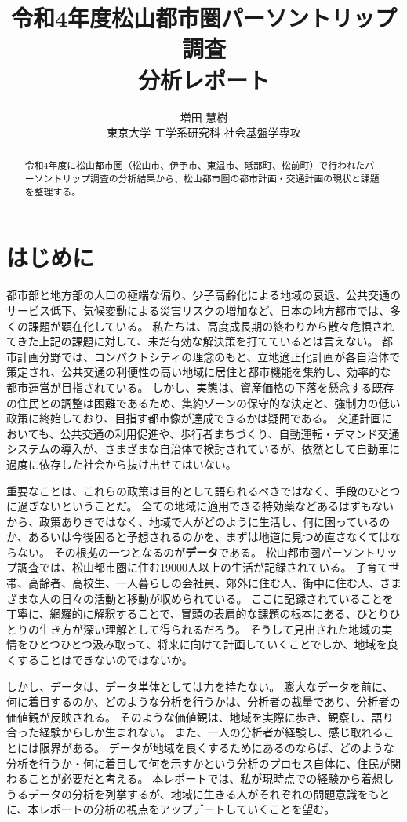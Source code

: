 \documentclass[a4paper,12pt]{jsbook}
\title{令和4年度松山都市圏パーソントリップ調査\\分析レポート
\vspace{10cm}}
\author{ \Large 増田 慧樹 \\
東京大学 工学系研究科 社会基盤学専攻
}
\date{}
\begin{document}
\maketitle

\begin{abstract}
令和4年度に松山都市圏（松山市、伊予市、東温市、砥部町、松前町）で行われたパーソントリップ調査の分析結果から、松山都市圏の都市計画・交通計画の現状と課題を整理する。
\end{abstract}

\tableofcontents

\chapter{はじめに}
都市部と地方部の人口の極端な偏り、少子高齢化による地域の衰退、公共交通のサービス低下、気候変動による災害リスクの増加など、日本の地方都市では、多くの課題が顕在化している。
私たちは、高度成長期の終わりから散々危惧されてきた上記の課題に対して、未だ有効な解決策を打てているとは言えない。
都市計画分野では、コンパクトシティの理念のもと、立地適正化計画が各自治体で策定され、公共交通の利便性の高い地域に居住と都市機能を集約し、効率的な都市運営が目指されている。
しかし、実態は、資産価格の下落を懸念する既存の住民との調整は困難であるため、集約ゾーンの保守的な決定と、強制力の低い政策に終始しており、目指す都市像が達成できるかは疑問である。
交通計画においても、公共交通の利用促進や、歩行者まちづくり、自動運転・デマンド交通システムの導入が、さまざまな自治体で検討されているが、依然として自動車に過度に依存した社会から抜け出せてはいない。

重要なことは、これらの政策は目的として語られるべきではなく、手段のひとつに過ぎないということだ。
全ての地域に適用できる特効薬などあるはずもないから、政策ありきではなく、地域で人がどのように生活し、何に困っているのか、あるいは今後困ると予想されるのかを、まずは地道に見つめ直さなくてはならない。
その根拠の一つとなるのが\textbf{データ}である。
松山都市圏パーソントリップ調査では、松山都市圏に住む19000人以上の生活が記録されている。
子育て世帯、高齢者、高校生、一人暮らしの会社員、郊外に住む人、街中に住む人、さまざまな人の日々の活動と移動が収められている。
ここに記録されていることを丁寧に、網羅的に解釈することで、冒頭の表層的な課題の根本にある、ひとりひとりの生き方が深い理解として得られるだろう。
そうして見出された地域の実情をひとつひとつ汲み取って、将来に向けて計画していくことでしか、地域を良くすることはできないのではないか。

しかし、データは、データ単体としては力を持たない。
膨大なデータを前に、何に着目するのか、どのような分析を行うかは、分析者の裁量であり、分析者の価値観が反映される。
そのような価値観は、地域を実際に歩き、観察し、語り合った経験からしか生まれない。
また、一人の分析者が経験し、感じ取れることには限界がある。
データが地域を良くするためにあるのならば、どのような分析を行うか・何に着目して何を示すかという分析のプロセス自体に、住民が関わることが必要だと考える。
本レポートでは、私が現時点での経験から着想しうるデータの分析を列挙するが、地域に生きる人がそれぞれの問題意識をもとに、本レポートの分析の視点をアップデートしていくことを望む。
\end{document}
